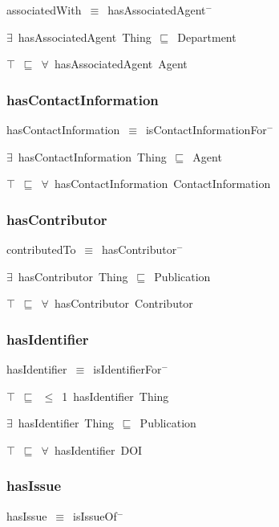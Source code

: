 \documentclass{article}
\begin{document}
associatedWith~\ensuremath{\equiv}~hasAssociatedAgent\ensuremath{^-}

\ensuremath{\exists}~hasAssociatedAgent~Thing~\ensuremath{\sqsubseteq}~Department

\ensuremath{\top}~\ensuremath{\sqsubseteq}~\ensuremath{\forall}~hasAssociatedAgent~Agent

\subsubsection*{hasContactInformation}

hasContactInformation~\ensuremath{\equiv}~isContactInformationFor\ensuremath{^-}

\ensuremath{\exists}~hasContactInformation~Thing~\ensuremath{\sqsubseteq}~Agent

\ensuremath{\top}~\ensuremath{\sqsubseteq}~\ensuremath{\forall}~hasContactInformation~ContactInformation

\subsubsection*{hasContributor}

contributedTo~\ensuremath{\equiv}~hasContributor\ensuremath{^-}

\ensuremath{\exists}~hasContributor~Thing~\ensuremath{\sqsubseteq}~Publication

\ensuremath{\top}~\ensuremath{\sqsubseteq}~\ensuremath{\forall}~hasContributor~Contributor

\subsubsection*{hasIdentifier}

hasIdentifier~\ensuremath{\equiv}~isIdentifierFor\ensuremath{^-}

\ensuremath{\top}~\ensuremath{\sqsubseteq}~\ensuremath{\leq}~1~hasIdentifier~Thing

\ensuremath{\exists}~hasIdentifier~Thing~\ensuremath{\sqsubseteq}~Publication

\ensuremath{\top}~\ensuremath{\sqsubseteq}~\ensuremath{\forall}~hasIdentifier~DOI

\subsubsection*{hasIssue}

hasIssue~\ensuremath{\equiv}~isIssueOf\ensuremath{^-}
\end{document}
